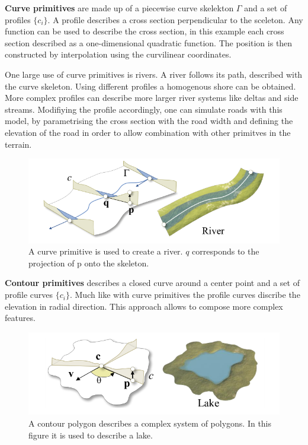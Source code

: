 \textbf{Curve primitives} are made up of a piecewise curve skelekton $\Gamma$ and a set of profiles $\{c_i\}$. A profile describes a cross section perpendicular to the sceleton. Any function can be used to describe the cross section, in this example each cross section described as a one-dimensional quadratic function. The position is then constructed by interpolation using the curvilinear coordinates. 

One large use of curve primitives is rivers. A river follows its path, described with the curve skeleton. Using different profiles a homogenous shore can be obtained. More complex profiles can describe more larger river systems like deltas and side streams. 
Modifiying the profile accordingly, one can simulate roads with this model, by parametrising the cross section with the road width and defining the elevation of the road in order to allow combination with other primitves in the terrain.

\begin{figure}[htb]
	\centering
	\includegraphics[width=.8\linewidth]{CGFCGF12530/curve_primitive}
	\caption{A curve primitive is used to create a river. $q$ corresponds to the projection of p onto the skeleton.}
	\label{fig:curve_primitive}
\end{figure}

\textbf{Contour primitives} describes a closed curve around a center point and a set of profile curves $\{ c_i \}$. Much like with curve primitives the profile curves discribe the elevation in radial direction. This approach allows to compose more complex features.

\begin{figure}[htb]
	\centering
	\includegraphics[width=.8\linewidth]{CGFCGF12530/contour_primitive}
	\caption{A contour polygon describes a complex system of polygons. In this figure it is used to describe a lake.}
	\label{fig:contour_primitive}
\end{figure}

